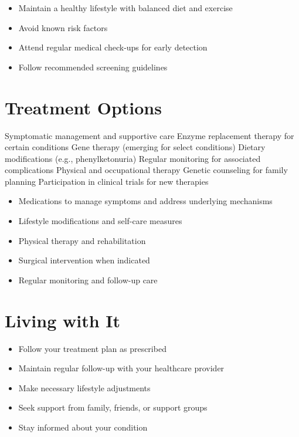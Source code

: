 \begin{itemize}[noitemsep]
  \item Maintain a healthy lifestyle with balanced diet and exercise
  \item Avoid known risk factors
  \item Attend regular medical check-ups for early detection
  \item Follow recommended screening guidelines
\end{itemize}
\section{Treatment Options}
Symptomatic management and supportive care Enzyme replacement therapy for certain conditions Gene therapy (emerging for select conditions) Dietary modifications (e.g., phenylketonuria) Regular monitoring for associated complications Physical and occupational therapy Genetic counseling for family planning Participation in clinical trials for new therapies

\begin{itemize}[noitemsep]
  \item Medications to manage symptoms and address underlying mechanisms
  \item Lifestyle modifications and self-care measures
  \item Physical therapy and rehabilitation
  \item Surgical intervention when indicated
  \item Regular monitoring and follow-up care
\end{itemize}
\section{Living with It}
\begin{itemize}[noitemsep]
  \item Follow your treatment plan as prescribed
  \item Maintain regular follow-up with your healthcare provider
  \item Make necessary lifestyle adjustments
  \item Seek support from family, friends, or support groups
  \item Stay informed about your condition
\end{itemize}
